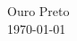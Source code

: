 {\begin{titlepage}
    	  \vfill
          \vfill
    	
    	  \begin{center}
    	    \begin{large}
    	      Ouro Preto \\
    	      \today \\
    	    \end{large}
    	  \end{center}    
    
    
    \clearpage
    \newpage

    \tableofcontents
    \conditionalLoF
    \conditionalLoT
    \conditionalLoL
	
    
    
    \end{titlepage}
}